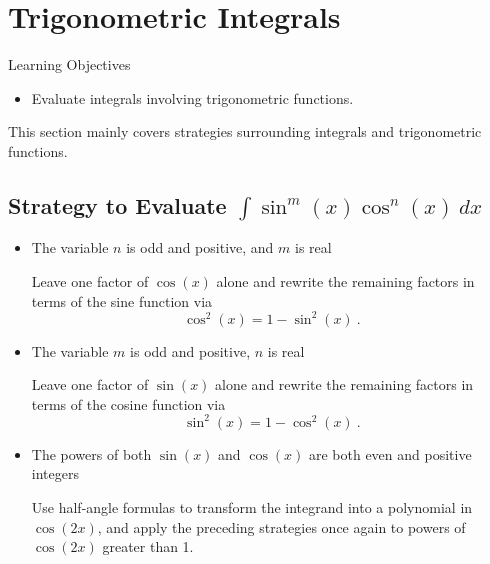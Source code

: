 \documentclass[compacto,10pt,comentarios]{aleph-notas}
\begin{document}
\encabezado

\section*{Trigonometric Integrals}
\begin{mdframed}
    \center Learning Objectives \\
    \begin{itemize}
        \item Evaluate integrals involving trigonometric functions.
    \end{itemize}
\end{mdframed}

This section mainly covers strategies surrounding integrals and trigonometric functions.

\subsection*{Strategy to Evaluate $\int \sin^{m}(x)\cos^{n}(x) ~ dx$}
\begin{itemize}
    \item The variable $n$ is odd and positive, and $m$ is real

    Leave one factor of $\cos(x)$ alone and rewrite the remaining factors in terms of the sine function via
    $$
        \cos^{2}(x) = 1 - \sin^{2}(x) ~.
    $$
    \item The variable $m$ is odd and positive, $n$ is real

    Leave one factor of $\sin(x)$ alone and rewrite the remaining factors in terms of the cosine function via
    $$
        \sin^{2}(x) = 1 - \cos^{2}(x) ~ .
    $$
    \item The powers of both $\sin(x)$ and $\cos(x)$ are both even and positive integers

    Use half-angle formulas to transform the integrand into a polynomial in $\cos(2x)$, and apply the preceding strategies once again to powers of $\cos(2x)$ greater than 1.
\end{itemize}
\end{document}
